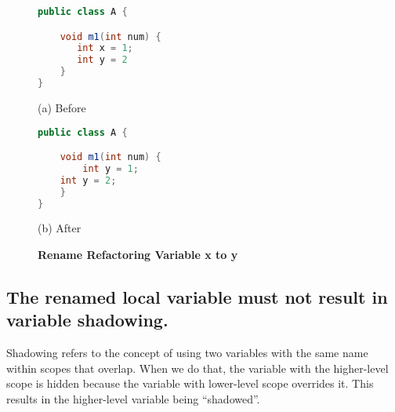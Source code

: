 \begin{figure}[th]
\centering
\begin{minipage}[t]{0.45\linewidth}
\begin{lstlisting}[language=java, basicstyle=\scriptsize\ttfamily,frame=single]
public class A {

    void m1(int num) {
       int x = 1; 
       int y = 2
    }
}
\end{lstlisting}
\centering(a) Before 
\end{minipage}
\hfill
\begin{minipage}[t]{0.45\linewidth}
\begin{lstlisting}[language=java, basicstyle=\scriptsize\ttfamily,frame=single]
public class A {

    void m1(int num) {
        int y = 1; 
	int y = 2;
    }
}
\end{lstlisting}
\centering(b) After 
\end{minipage}
\caption{\textbf{Rename Refactoring Variable x to y}}
\label{figure:precond5_2}
\end{figure}

\subsection{The renamed local variable must not result in variable shadowing.}
Shadowing refers to the concept of using two variables with the same name within scopes that overlap. When we do that, the variable with the higher-level scope is hidden because the variable with lower-level scope overrides it. This results in the higher-level variable being ``shadowed''. 

